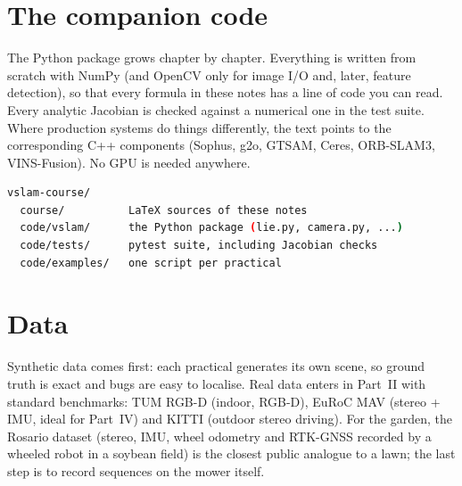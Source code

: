 \section*{The companion code}

The Python package  grows chapter by chapter. Everything is
written from scratch with NumPy (and OpenCV only for image I/O and, later,
feature detection), so that every formula in these notes has a line of
code you can read. Every analytic Jacobian is checked against a numerical
one in the test suite. Where production systems do things differently, the
text points to the corresponding C++ components (Sophus, g2o, GTSAM,
Ceres, ORB-SLAM3, VINS-Fusion). No GPU is needed anywhere.

\begin{lstlisting}[language=bash,caption={Repository layout}]
vslam-course/
  course/          LaTeX sources of these notes
  code/vslam/      the Python package (lie.py, camera.py, ...)
  code/tests/      pytest suite, including Jacobian checks
  code/examples/   one script per practical
\end{lstlisting}

\section*{Data}

Synthetic data comes first: each practical generates its own scene, so
ground truth is exact and bugs are easy to localise. Real data enters in
Part~II with standard benchmarks: TUM RGB-D (indoor, RGB-D), EuRoC MAV
(stereo + IMU, ideal for Part~IV) and KITTI (outdoor stereo driving). For
the garden, the Rosario dataset (stereo, IMU, wheel odometry and RTK-GNSS
recorded by a wheeled robot in a soybean field) is the closest public
analogue to a lawn; the last step is to record sequences on the mower
itself.
